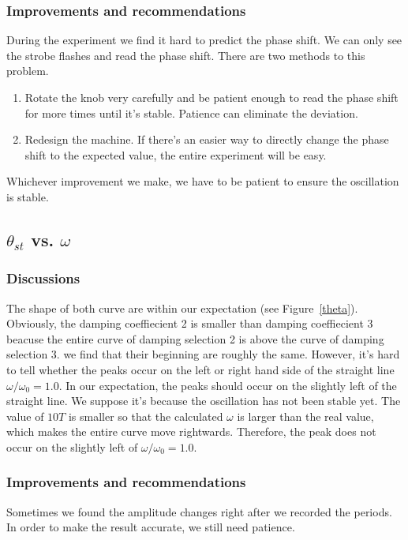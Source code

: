 \subsubsection{Improvements and recommendations}

During the experiment we find it hard to predict the phase shift. We can only
see the strobe flashes and read the phase shift. There are two methods to this
problem. 

\begin{enumerate}
\item Rotate the knob very carefully and be patient enough to read the phase
  shift for more times until it's stable. Patience can eliminate the deviation. 
\item Redesign the machine. If there's an easier way to directly change the
  phase shift to the expected value, the entire experiment will be easy. 
\end{enumerate}

Whichever improvement we make, we have to be patient to ensure the oscillation
is stable. 

\subsection{$\theta_{st}$ vs. $\omega$}

\subsubsection{Discussions}

The shape of both curve are within our expectation (see Figure~\ref{theta}).
Obviously, the damping coeffiecient 2 is smaller than damping coeffiecient 3
beacuse the entire curve of damping selection 2 is above the curve of damping
selection 3. we find that their beginning are roughly the same. However, it's
hard to tell whether the peaks occur on the left or right hand side of the
straight line $\omega/\omega_0=1.0$. In our expectation, the peaks should occur
on the slightly left of the straight line. We suppose it's because the
oscillation has not been stable yet. The value of $10T$ is smaller so that the
calculated $\omega$ is larger than the real value, which makes the entire curve
move rightwards. Therefore, the peak does not occur on the slightly left of
$\omega/\omega_0=1.0$. 

\subsubsection{Improvements and recommendations}

Sometimes we found the amplitude changes right after we recorded the periods. In
order to make the result accurate, we still need patience.  